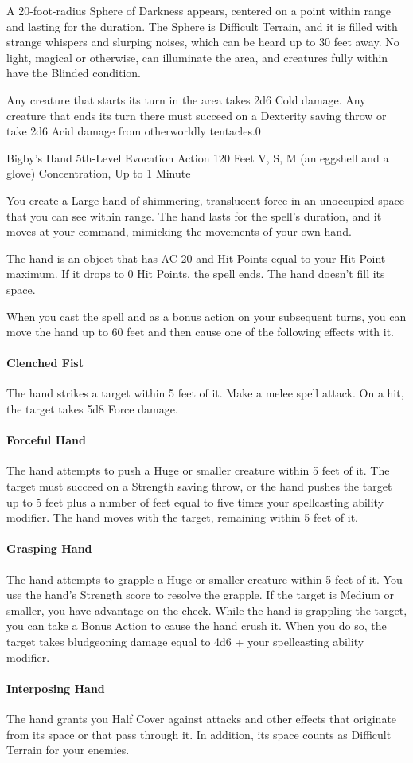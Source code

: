 \noindent A 20-foot-radius Sphere of Darkness appears, centered on a point within range and lasting for the duration. The Sphere is Difficult Terrain, and it is filled with strange whispers and slurping noises, which can be heard up to 30 feet away. No light, magical or otherwise, can illuminate the area, and creatures fully within have the Blinded condition.

Any creature that starts its turn in the area takes 2d6 Cold damage. Any creature that ends its turn there must succeed on a Dexterity saving throw or take 2d6 Acid damage from otherworldly tentacles.0

\DndSpellHeader
  {Bigby's Hand}
  {5th-Level Evocation}
  {Action}
  {120 Feet}
  {V, S, M (an eggshell and a glove)}
  {Concentration, Up to 1 Minute}

You create a Large hand of shimmering, translucent force in an unoccupied space that you can see within range. The hand lasts for the spell's duration, and it moves at your command, mimicking the movements of your own hand.

The hand is an object that has AC 20 and Hit Points equal to your Hit Point maximum. If it drops to 0 Hit Points, the spell ends. The hand doesn't fill its space.

When you cast the spell and as a bonus action on your subsequent turns, you can move the hand up to 60 feet and then cause one of the following effects with it.

\paragraph*{Clenched Fist} The hand strikes a target within 5 feet of it. Make a melee spell attack. On a hit, the target takes 5d8 Force damage.
\paragraph*{Forceful Hand} The hand attempts to push a Huge or smaller creature within 5 feet of it. The target must succeed on a Strength saving throw, or the hand pushes the target up to 5 feet plus a number of feet equal to five times your spellcasting ability modifier. The hand moves with the target, remaining within 5 feet of it.
\paragraph*{Grasping Hand} The hand attempts to grapple a Huge or smaller creature within 5 feet of it. You use the hand's Strength score to resolve the grapple. If the target is Medium or smaller, you have advantage on the check. While the hand is grappling the target, you can take a Bonus Action to cause the hand crush it. When you do so, the target takes bludgeoning damage equal to 4d6 + your spellcasting ability modifier.
\paragraph*{Interposing Hand} The hand grants you Half Cover against attacks and other effects that originate from its space or that pass through it. In addition, its space counts as Difficult Terrain for your enemies.